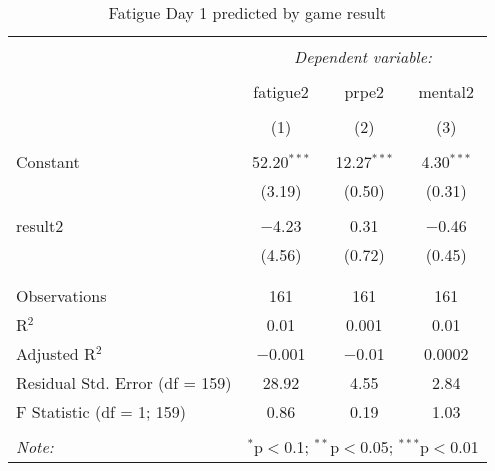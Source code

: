 
\begin{table}[!htbp] \centering 
  \caption{Fatigue Day 1 predicted by game result} 
  \label{tab:fatigueDay1Result} 
\footnotesize 
\begin{tabular}{@{\extracolsep{5pt}}lccc} 
\\[-1.8ex]\hline 
\hline \\[-1.8ex] 
 & \multicolumn{3}{c}{\textit{Dependent variable:}} \\ 
\cline{2-4} 
\\[-1.8ex] & fatigue2 & prpe2 & mental2 \\ 
\\[-1.8ex] & (1) & (2) & (3)\\ 
\hline \\[-1.8ex] 
 Constant & 52.20$^{***}$ & 12.27$^{***}$ & 4.30$^{***}$ \\ 
  & (3.19) & (0.50) & (0.31) \\ 
  & & & \\ 
 result2 & $-$4.23 & 0.31 & $-$0.46 \\ 
  & (4.56) & (0.72) & (0.45) \\ 
  & & & \\ 
\hline \\[-1.8ex] 
Observations & 161 & 161 & 161 \\ 
R$^{2}$ & 0.01 & 0.001 & 0.01 \\ 
Adjusted R$^{2}$ & $-$0.001 & $-$0.01 & 0.0002 \\ 
Residual Std. Error (df = 159) & 28.92 & 4.55 & 2.84 \\ 
F Statistic (df = 1; 159) & 0.86 & 0.19 & 1.03 \\ 
\hline 
\hline \\[-1.8ex] 
\textit{Note:}  & \multicolumn{3}{r}{$^{*}$p$<$0.1; $^{**}$p$<$0.05; $^{***}$p$<$0.01} \\ 
\end{tabular} 
\end{table} 
